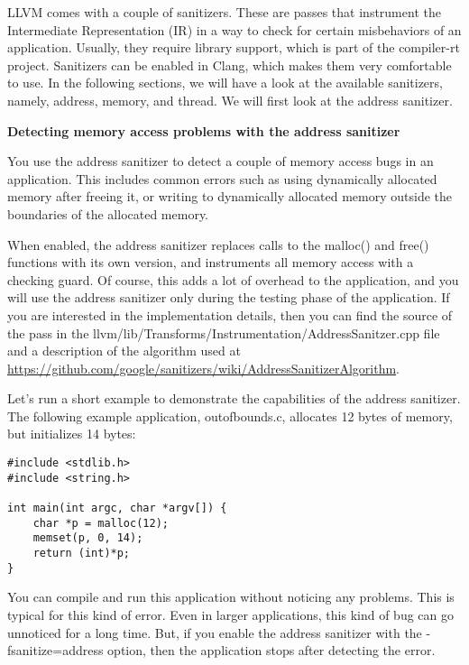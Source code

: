 
LLVM comes with a couple of sanitizers. These are passes that instrument the Intermediate Representation (IR) in a way to check for certain misbehaviors of an application. Usually, they require library support, which is part of the compiler-rt project. Sanitizers can be enabled in Clang, which makes them very comfortable to use. In the following sections, we will have a look at the available sanitizers, namely, address, memory, and thread. We will first look at the address sanitizer.\par

\hspace*{\fill} \par %
\textbf{Detecting memory access problems with the address sanitizer}

You use the address sanitizer to detect a couple of memory access bugs in an application. This includes common errors such as using dynamically allocated memory after freeing it, or writing to dynamically allocated memory outside the boundaries of the allocated memory.\par

When enabled, the address sanitizer replaces calls to the malloc() and free() functions with its own version, and instruments all memory access with a checking guard. Of course, this adds a lot of overhead to the application, and you will use the address sanitizer only during the testing phase of the application. If you are interested in the implementation details, then you can find the source of the pass in the llvm/lib/Transforms/Instrumentation/AddressSanitzer.cpp file and a description of the algorithm used at \url{https://github.com/google/sanitizers/wiki/AddressSanitizerAlgorithm}.\par

Let's run a short example to demonstrate the capabilities of the address sanitizer. The following example application, outofbounds.c, allocates 12 bytes of memory, but initializes 14 bytes:\par

\begin{lstlisting}[caption={}]
#include <stdlib.h>
#include <string.h>

int main(int argc, char *argv[]) {
	char *p = malloc(12);
	memset(p, 0, 14);
	return (int)*p;
}
\end{lstlisting}

You can compile and run this application without noticing any problems. This is typical for this kind of error. Even in larger applications, this kind of bug can go unnoticed for a long time. But, if you enable the address sanitizer with the -fsanitize=address option, then the application stops after detecting the error.\par

